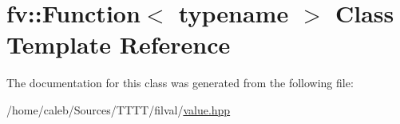 \hypertarget{classfv_1_1Function}{}\section{fv\+:\+:Function$<$ typename $>$ Class Template Reference}
\label{classfv_1_1Function}


The documentation for this class was generated from the following file\+:\begin{DoxyCompactItemize}
\item 
/home/caleb/\+Sources/\+T\+T\+T\+T/filval/\hyperlink{value_8hpp}{value.\+hpp}\end{DoxyCompactItemize}
